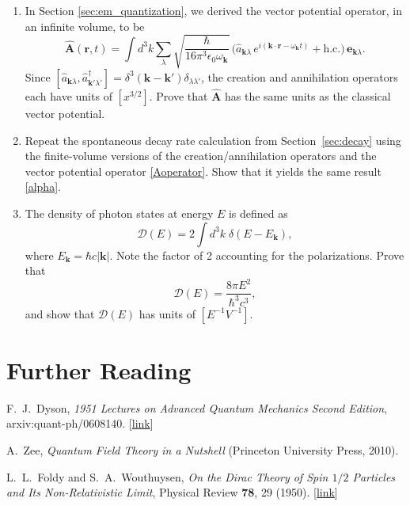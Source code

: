 \documentclass[prx,12pt]{revtex4-2}
\begin{document}
\begin{enumerate}
\item
  In Section \ref{sec:em_quantization}, we derived the vector
  potential operator, in an infinite volume, to be
  \begin{equation}
    \hat{\mathbf{A}}(\mathbf{r},t) = \int d^3k \sum_{\lambda} 
  \sqrt{\frac{\hbar}{16\pi^3\epsilon_0\omega_{\mathbf{k}}}}\,
  \Big(\hat{a}_{\mathbf{k}\lambda} \, e^{i(\mathbf{k}\cdot\mathbf{r} - \omega_{\mathbf{k}} t)}
  + \mathrm{h.c.}\Big)\, \mathbf{e}_{\mathbf{k}\lambda}.
  \end{equation}
  Since $[\hat{a}_{\mathbf{k}\lambda},
    \hat{a}^\dagger_{\mathbf{k}'\lambda'}] =
  \delta^3(\mathbf{k}-\mathbf{k}') \delta_{\lambda\lambda'}$, the
  creation and annihilation operators each have units of $[x^{3/2}]$.
  Prove that $\hat{\mathbf{A}}$ has the same units as the classical
  vector potential.

\item Repeat the spontaneous decay rate calculation from
  Section~\ref{sec:decay} using the finite-volume versions of the
  creation/annihilation operators and the vector potential operator
  \eqref{Aoperator}.  Show that it yields the same result
  \eqref{alpha}.
  \label{ex:alpha_finite}

\item
  The density of photon states at energy $E$ is defined as
  \begin{equation}
    \mathcal{D}(E) = 2\int d^3k\; \delta(E-E_{\mathbf{k}}),
  \end{equation}
  where $E_{\mathbf{k}} = \hbar c |\mathbf{k}|$.  Note the factor of 2
  accounting for the polarizations.  Prove that
  \begin{equation}
    \mathcal{D}(E) = \frac{8\pi E^2}{\hbar^3c^3},
  \end{equation}
  and show that $\mathcal{D}(E)$ has units of $[E^{-1}V^{-1}]$.
  \label{ex:DE}

\end{enumerate}

\section*{Further Reading}

\begin{enumerate}[[1{]}]
\item F.~J.~Dyson, \textit{1951 Lectures on Advanced Quantum Mechanics
  Second Edition}, arxiv:quant-ph/0608140. [\href{https://arxiv.org/abs/quant-ph/0608140}{link}]
\label{cite:dyson}

\item A.~Zee, \textit{Quantum Field Theory in a Nutshell} (Princeton
  University Press, 2010).
\label{cite:zee}

\item L.~L.~Foldy and S.~A.~Wouthuysen, \textit{On the Dirac Theory of
  Spin $1/2$ Particles and Its Non-Relativistic Limit}, Physical
  Review \textbf{78}, 29 (1950). [\href{https://journals.aps.org/pr/abstract/10.1103/PhysRev.78.29}{link}]
\label{cite:foldy}
\end{enumerate}
\end{document}
